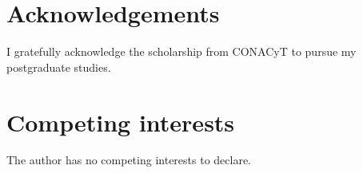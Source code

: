 \documentclass{article}
\begin{document}
\section*{Acknowledgements}

I gratefully acknowledge the scholarship from CONACyT to pursue my postgraduate studies.

\section*{Competing interests}

The author has no competing interests to declare.




%
%
%
%
\end{document}
